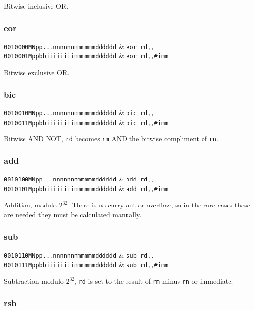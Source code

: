 Bitwise inclusive OR.

\subsubsection{eor}

\decfmt
\texttt{0010000MNpp...nnnnnnmmmmmmdddddd} & \texttt{eor rd,,} \\
\texttt{0010001Mppbbiiiiiiiimmmmmmdddddd} & \texttt{eor rd,,\#imm}
\finfmt

Bitwise exclusive OR.

\subsubsection{bic}

\decfmt
\texttt{0010010MNpp...nnnnnnmmmmmmdddddd} & \texttt{bic rd,,} \\
\texttt{0010011Mppbbiiiiiiiimmmmmmdddddd} & \texttt{bic rd,,\#imm}
\finfmt

Bitwise AND NOT, \texttt{rd} becomes \texttt{rm} AND the bitwise compliment of \texttt{rn}.

\subsubsection{add}

\decfmt
\texttt{0010100MNpp...nnnnnnmmmmmmdddddd} & \texttt{add rd,,} \\
\texttt{0010101Mppbbiiiiiiiimmmmmmdddddd} & \texttt{add rd,,\#imm}
\finfmt

Addition, modulo $2^{32}$. There is no carry-out or overflow, so in the rare cases these are needed they must be calculated manually.

\subsubsection{sub}

\decfmt
\texttt{0010110MNpp...nnnnnnmmmmmmdddddd} & \texttt{sub rd,,} \\
\texttt{0010111Mppbbiiiiiiiimmmmmmdddddd} & \texttt{sub rd,,\#imm}
\finfmt

Subtraction modulo $2^{32}$, \texttt{rd} is set to the result of \texttt{rm} minus \texttt{rn} or immediate.

\subsubsection{rsb}

